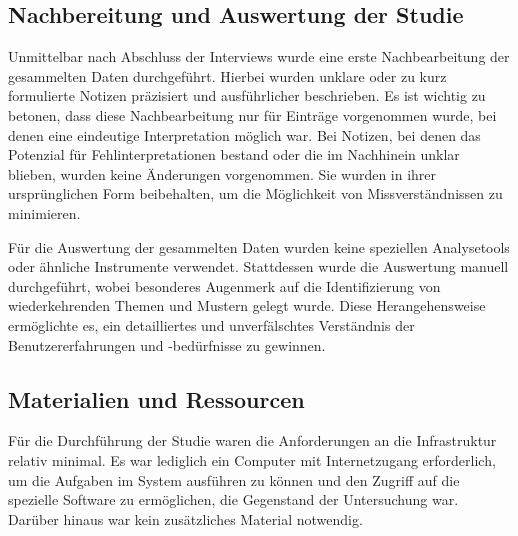 \subsection{Nachbereitung und Auswertung der Studie}

Unmittelbar nach Abschluss der Interviews wurde eine erste Nachbearbeitung der gesammelten Daten durchgeführt. Hierbei wurden unklare oder zu kurz formulierte Notizen präzisiert und ausführlicher beschrieben. Es ist wichtig zu betonen, dass diese Nachbearbeitung nur für Einträge vorgenommen wurde, bei denen eine eindeutige Interpretation möglich war. Bei Notizen, bei denen das Potenzial für Fehlinterpretationen bestand oder die im Nachhinein unklar blieben, wurden keine Änderungen vorgenommen. Sie wurden in ihrer ursprünglichen Form beibehalten, um die Möglichkeit von Missverständnissen zu minimieren.

Für die Auswertung der gesammelten Daten wurden keine speziellen Analysetools oder ähnliche Instrumente verwendet. Stattdessen wurde die Auswertung manuell durchgeführt, wobei besonderes Augenmerk auf die Identifizierung von wiederkehrenden Themen und Mustern gelegt wurde. Diese Herangehensweise ermöglichte es, ein detailliertes und unverfälschtes Verständnis der Benutzererfahrungen und -bedürfnisse zu gewinnen.

\subsection{Materialien und Ressourcen}

Für die Durchführung der Studie waren die Anforderungen an die Infrastruktur relativ minimal. Es war lediglich ein Computer mit Internetzugang erforderlich, um die Aufgaben im System ausführen zu können und den Zugriff auf die spezielle Software zu ermöglichen, die Gegenstand der Untersuchung war.\\
Darüber hinaus war kein zusätzliches Material notwendig.
